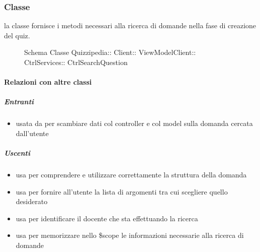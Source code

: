 \subsubsection{Classe }
la classe fornisce i metodi necessari alla ricerca di domande nella fase di creazione del quiz.
\begin{figure}[H]
\centering
\noindent{}
\caption[Schema Classe CtrlSearchQuestion]{Schema Classe Quizzipedia:: Client:: ViewModelClient:: CtrlServices:: CtrlSearchQuestion}
\end{figure}
\paragraph{Relazioni con altre classi}
\subparagraph{Entranti}
\begin{itemize}
\item usata da  per scambiare dati col controller e col model sulla domanda cercata dall'utente
\end{itemize}
\subparagraph{Uscenti}
\begin{itemize}
\item usa  per comprendere e utilizzare correttamente la struttura della domanda
\item usa  per fornire all'utente la lista di argomenti tra cui scegliere quello desiderato
\item usa  per identificare il docente che sta effettuando la ricerca
\item usa  per memorizzare nello \$scope le informazioni necessarie alla ricerca di domande
\end{itemize}
